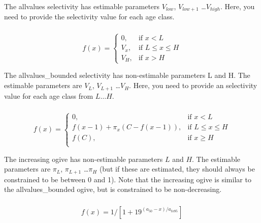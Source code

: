 The allvalues selectivity has estimable parameters $V_{low}$, $V_{low+1}$ \ldots $V_{high}$. Here, you need to provide the selectivity value for each age class.

\subsubsection*{}

\begin{equation}
f(x)=\begin{cases}
		 0, & \text{if $x < L$} \\
		 V_x, & \text{if $L \le x \le H$} \\
		 V_H, & \text{if $x > H$}
  \end{cases}
\end{equation}

The allvalues\_bounded selectivity has non-estimable parameters L and H. The estimable parameters are $V_L$, $V_{L+1}$ \ldots $V_H$. Here, you need to provide an selectivity value for each age class from $L \ldots H$.

\subsubsection*{}

\begin{equation} 
f(x)=\begin{cases}
	  0, & \text{if $x < L$} \\
	  f(x-1)+ \pi_x(C-f(x-1)), & \text{if $L \le x \le H$} \\
	  f(C), & \text{if $x \ge H$} \\  
  \end{cases}
\end{equation}

The increasing ogive has non-estimable parameters $L$ and $H$. The estimable parameters are $\pi_L$, $\pi_{L+1}$ \ldots $\pi_H$ (but if these are estimated, they should always be constrained to be between 0 and 1). Note that the increasing ogive is similar to the allvalues\_bounded ogive, but is constrained to be non-decreasing.

\subsubsection*{}

\begin{equation}
  f(x) =1 / [1+19^{(a_{50}-x)/a_{to95}}]
\end{equation}
 
